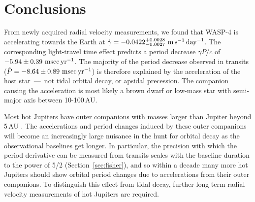 \documentclass[12pt,twocolumn,tighten]{aastex62}
\begin{document}
\section{Conclusions}
\label{sec:conclusions}

From newly acquired radial velocity measurements, we found that WASP-4
is accelerating towards the Earth at $\dot{\gamma} =
-0.0422^{+0.0028}_{-0.0027}\ {\rm m}\,{\rm s}^{-1}\,{\rm day}^{-1}$.
The corresponding light-travel time effect predicts a period decrease
$\dot{\gamma} P/c$ of $-5.94 \pm 0.39~{\rm msec}\,{\rm yr}^{-1}$.  The
majority of the period decrease observed in transits ($\dot{P}= - 8.64
\pm 0.89~{\rm msec}\,{\rm yr}^{-1}$) is therefore explained by the
acceleration of the host star~---~not tidal orbital decay, or apsidal
precession.  The companion causing the acceleration is most likely a
brown dwarf or low-mass star with semi-major axis between
10-100$\,$AU.

Most hot Jupiters have outer companions with masses larger than
Jupiter beyond 5$\,$AU
\citep{knutson_friends_2014,bryan_statistics_2016}. The accelerations
and period changes induced by these outer companions will become an
increasingly large nuisance in the hunt for orbital decay as the
observational baselines get longer.  In particular, the precision with
which the period derivative can be measured from transits scales with
the baseline duration to the power of 5/2 (Section~\ref{sec:fisher}), and
so within a decade many more hot Jupiters should show orbital period
changes due to accelerations from their outer companions.  
To distinguish this effect from tidal decay, further long-term radial
velocity measurements of hot Jupiters are required.

\end{document}
